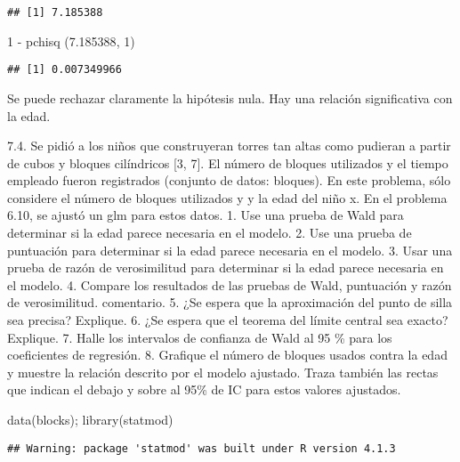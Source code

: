 \documentclass[
]{article}
\newenvironment{Shaded}{\begin{snugshade}}{\end{snugshade}}
\newcommand{\DecValTok}[1]{\textcolor[rgb]{0.00,0.00,0.81}{#1}}
\newcommand{\FloatTok}[1]{\textcolor[rgb]{0.00,0.00,0.81}{#1}}
\newcommand{\FunctionTok}[1]{\textcolor[rgb]{0.00,0.00,0.00}{#1}}
\newcommand{\NormalTok}[1]{#1}
\newcommand{\SpecialCharTok}[1]{\textcolor[rgb]{0.00,0.00,0.00}{#1}}
\begin{document}
\begin{verbatim}
## [1] 7.185388
\end{verbatim}

\begin{Shaded}
\begin{Highlighting}[]
\DecValTok{1} \SpecialCharTok{{-}} \FunctionTok{pchisq}\NormalTok{ (}\FloatTok{7.185388}\NormalTok{, }\DecValTok{1}\NormalTok{)}
\end{Highlighting}
\end{Shaded}

\begin{verbatim}
## [1] 0.007349966
\end{verbatim}

Se puede rechazar claramente la hipótesis nula. Hay una relación
significativa con la edad.

7.4. Se pidió a los niños que construyeran torres tan altas como
pudieran a partir de cubos y bloques cilíndricos {[}3, 7{]}. El número
de bloques utilizados y el tiempo empleado fueron registrados (conjunto
de datos: bloques). En este problema, sólo considere el número de
bloques utilizados y y la edad del niño x. En el problema 6.10, se
ajustó un glm para estos datos. 1. Use una prueba de Wald para
determinar si la edad parece necesaria en el modelo. 2. Use una prueba
de puntuación para determinar si la edad parece necesaria en el modelo.
3. Usar una prueba de razón de verosimilitud para determinar si la edad
parece necesaria en el modelo. 4. Compare los resultados de las pruebas
de Wald, puntuación y razón de verosimilitud. comentario. 5. ¿Se espera
que la aproximación del punto de silla sea precisa? Explique. 6. ¿Se
espera que el teorema del límite central sea exacto? Explique. 7. Halle
los intervalos de confianza de Wald al 95 \% para los coeficientes de
regresión. 8. Grafique el número de bloques usados contra la edad y
muestre la relación descrito por el modelo ajustado. Traza también las
rectas que indican el debajo y sobre al 95\% de IC para estos valores
ajustados.

\begin{Shaded}
\begin{Highlighting}[]
\FunctionTok{data}\NormalTok{(blocks); }\FunctionTok{library}\NormalTok{(statmod)}
\end{Highlighting}
\end{Shaded}

\begin{verbatim}
## Warning: package 'statmod' was built under R version 4.1.3
\end{verbatim}
\end{document}
